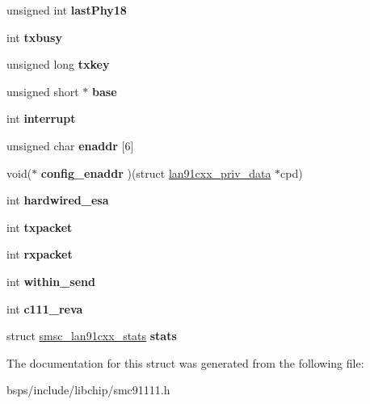 \begin{DoxyCompactItemize}
unsigned int {\bfseries last\+Phy18}
\item 
\mbox{\label{structlan91cxx__priv__data_a7b4bd06b2e8f29c112dfc610d415c5c0}} 
int {\bfseries txbusy}
\item 
\mbox{\label{structlan91cxx__priv__data_a700471f443b8460002d735622c136b22}} 
unsigned long {\bfseries txkey}
\item 
\mbox{\label{structlan91cxx__priv__data_a7d14200c9d604d09a878d8fd8c46119b}} 
unsigned short $\ast$ {\bfseries base}
\item 
\mbox{\label{structlan91cxx__priv__data_a19ba85ee51c0930cb364bde50f02c7b6}} 
int {\bfseries interrupt}
\item 
\mbox{\label{structlan91cxx__priv__data_afe609af811ca3fb11966c5d20b2c06a4}} 
unsigned char {\bfseries enaddr} \mbox{[}6\mbox{]}
\item 
\mbox{\label{structlan91cxx__priv__data_ae4a7cbedb1c8d50432bd6677e2ca16b5}} 
void($\ast$ {\bfseries config\+\_\+enaddr} )(struct \mbox{\hyperlink{structlan91cxx__priv__data}{lan91cxx\+\_\+priv\+\_\+data}} $\ast$cpd)
\item 
\mbox{\label{structlan91cxx__priv__data_aa9fdeb9ec9781e85cc0feb16aec1868b}} 
int {\bfseries hardwired\+\_\+esa}
\item 
\mbox{\label{structlan91cxx__priv__data_a9cbe9911ee38a3c7b8e7dba2e8f97d70}} 
int {\bfseries txpacket}
\item 
\mbox{\label{structlan91cxx__priv__data_ab492c6289b96668d8abe6681a6cf792e}} 
int {\bfseries rxpacket}
\item 
\mbox{\label{structlan91cxx__priv__data_a4805549a135a65c79b12bc838cd84954}} 
int {\bfseries within\+\_\+send}
\item 
\mbox{\label{structlan91cxx__priv__data_aa12c72bc196d89e6a9c783b728331998}} 
int {\bfseries c111\+\_\+reva}
\item 
\mbox{\label{structlan91cxx__priv__data_a33eeee792bffbd8783ca3d8574ef1111}} 
struct \mbox{\hyperlink{structsmsc__lan91cxx__stats}{smsc\+\_\+lan91cxx\+\_\+stats}} {\bfseries stats}
\end{DoxyCompactItemize}


The documentation for this struct was generated from the following file\+:\begin{DoxyCompactItemize}
\item 
bsps/include/libchip/smc91111.\+h\end{DoxyCompactItemize}
